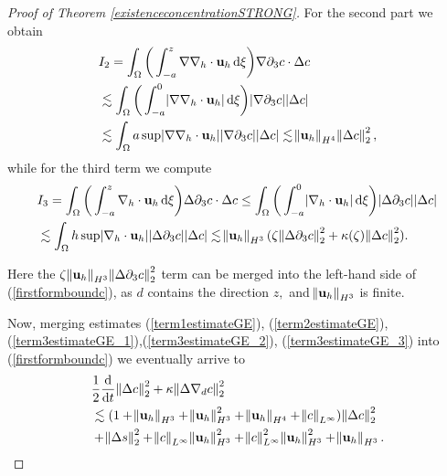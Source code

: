 \documentclass[11pt, a4paper]{article}
\newcommand*\diff{\mathop{}\!\mathrm{d}}
\begin{document}
\begin{proof}[Proof of Theorem \ref{existenceconcentrationSTRONG}]
For the second part we obtain
%
\begin{equation} \label{term3estimateGE_2}
\begin{split}
& I_2 = \int_\Omega \bigg ( \int_{-a}^z \nabla \nabla_h \cdot \mathbf{u}_h \diff \xi \bigg) \nabla \partial_3 c \cdot \Delta c \\
& \lesssim \int_\Omega \bigg ( \int_{-a}^0 \abs{\nabla \nabla_h \cdot \mathbf{u}_h} \diff \xi \bigg) \abs{\nabla \partial_3 c} \abs{\Delta c} \\
& \lesssim \int_\Omega a \sup \abs{\nabla \nabla_h \cdot \mathbf{u}_h} \abs{\nabla \partial_3 c} \abs{\Delta c} \lesssim \norm{\mathbf{u}_h}_{H^4} \norm{\Delta c}_2^2,
\end{split}
\end{equation}
%
while for the third term we compute
%
\begin{equation} \label{term3estimateGE_3}
\begin{split}
& I_3 = \int_\Omega \bigg ( \int_{-a}^z \nabla_h \cdot \mathbf{u}_h \diff \xi \bigg) \Delta \partial_3 c \cdot \Delta c \leq \int_\Omega \bigg ( \int_{-a}^0 \abs{\nabla_h \cdot \mathbf{u}_h} \diff \xi \bigg) \abs{\Delta \partial_3 c} \abs{\Delta c}\\
& \lesssim \int_\Omega h \sup{\abs{\nabla_h \cdot \mathbf{u}_h}} \abs{\Delta \partial_3 c} \abs{\Delta c} \lesssim \norm{\mathbf{u}_h}_{H^3} (\zeta \norm{\Delta \partial_3 c}_2^2 + \kappa(\zeta)\norm{\Delta c}_2^2 ).
\end{split}
\end{equation}

Here the $\zeta \norm{\mathbf{u}_h}_{H^3} \norm{\Delta \partial_3 c}_2^2$ term can be merged into the left-hand side of (\ref{firstformboundc}), as $d$ contains the direction $z,$ and $\norm{\mathbf{u}_h}_{H^3}$ is finite.

Now, merging estimates (\ref{term1estimateGE}), (\ref{term2estimateGE}), (\ref{term3estimateGE_1}),(\ref{term3estimateGE_2}), (\ref{term3estimateGE_3}) into (\ref{firstformboundc}) we eventually arrive to
%
\begin{equation} \label{Gronwallstructureready}
\begin{split}
& \frac{1}{2} \frac{\diff}{\diff t} \norm{\Delta c}_2^2 + \kappa \norm{\Delta \nabla_d c}_2^2 \\
& \lesssim (1 + \norm{\mathbf{u}_h}_{H^3} + \norm{\mathbf{u}_h}_{H^3}^2 + \norm{\mathbf{u}_h}_{H^4} + \norm{c}_{L^\infty})\norm{\Delta c}_2^2 \\
& + \norm{\Delta s}_2^2 + \norm{c}_{L^\infty} \norm{\mathbf{u}_h}_{H^3}^2 + \norm{c}_{L^\infty}^2 \norm{\mathbf{u}_h}_{H^3}^2 + \norm{\mathbf{u}_h}_{H^3}.
\end{split}
\end{equation}


\end{proof}
\end{document}

